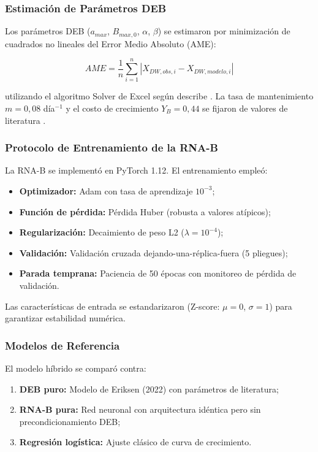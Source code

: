 \documentclass[12pt,a4paper]{article}
\begin{document}
\subsubsection{Estimaci\'{o}n de Par\'{a}metros DEB}

Los par\'{a}metros DEB ($a_{max}$, $B_{max,0}$, $\alpha$, $\beta$) se estimaron por minimizaci\'{o}n de cuadrados no lineales del Error Medio Absoluto (AME):

\begin{equation}
    AME = \frac{1}{n}\sum_{i=1}^{n} |X_{DW,obs,i} - X_{DW,modelo,i}| \label{eq:ame}
\end{equation}

utilizando el algoritmo Solver de Excel seg\'{u}n describe \citet{eriksenDynamicModellingFeed2022}. La tasa de mantenimiento $m = 0,08$ d\'{i}a$^{-1}$ y el costo de crecimiento $Y_B = 0,44$ se fijaron de valores de literatura \citep{laganaroGrowthMetabolicPerformance2021a}.

\subsubsection{Protocolo de Entrenamiento de la RNA-B}

La RNA-B se implement\'{o} en PyTorch 1.12. El entrenamiento emple\'{o}:
\begin{itemize}
    \item \textbf{Optimizador:} Adam con tasa de aprendizaje $10^{-3}$;
    \item \textbf{Funci\'{o}n de p\'{e}rdida:} P\'{e}rdida Huber (robusta a valores at\'{i}picos);
    \item \textbf{Regularizaci\'{o}n:} Decaimiento de peso L2 ($\lambda = 10^{-4}$);
    \item \textbf{Validaci\'{o}n:} Validaci\'{o}n cruzada dejando-una-r\'{e}plica-fuera (5 pliegues);
    \item \textbf{Parada temprana:} Paciencia de 50 \'{e}pocas con monitoreo de p\'{e}rdida de validaci\'{o}n.
\end{itemize}

Las caracter\'{i}sticas de entrada se estandarizaron (Z-score: $\mu = 0$, $\sigma = 1$) para garantizar estabilidad num\'{e}rica.

\subsubsection{Modelos de Referencia}

El modelo h\'{i}brido se compar\'{o} contra:
\begin{enumerate}
    \item \textbf{DEB puro:} Modelo de Eriksen (2022) con par\'{a}metros de literatura;
    \item \textbf{RNA-B pura:} Red neuronal con arquitectura id\'{e}ntica pero sin precondicionamiento DEB;
    \item \textbf{Regresi\'{o}n log\'{i}stica:} Ajuste cl\'{a}sico de curva de crecimiento.
\end{enumerate}
\end{document}
